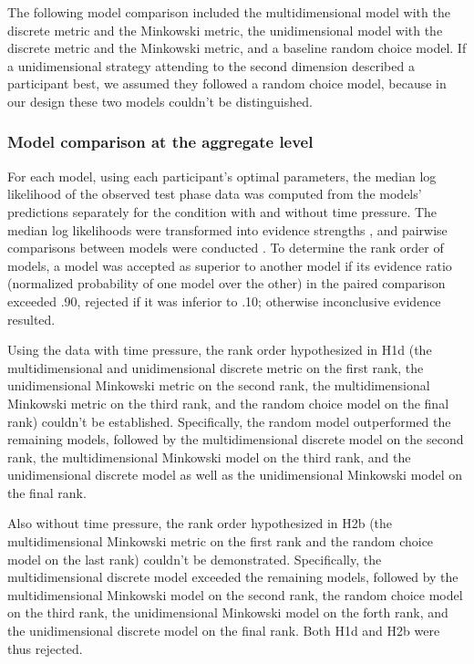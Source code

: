 \documentclass[a4paper,man,natbib]{apa6}
\begin{document}
The following model comparison included the multidimensional model with the discrete metric and the Minkowski metric, the unidimensional model with the discrete metric and the Minkowski metric, and a baseline random choice model. If a unidimensional strategy attending to the second dimension described a participant best, we assumed they followed a random choice model, because in our design these two models couldn't be distinguished. 

\subsubsection{Model comparison at the aggregate level} \label{sec:res_agg}
For each model, using each participant's optimal parameters, the median log likelihood of the observed test phase data was computed from the models' predictions separately for the condition with and without time pressure. The median log likelihoods were transformed into evidence strengths \citep[Akake weights,][]{wagenmakers2004aic}, and pairwise comparisons between models were conducted \citep[as in][p. 194]{wagenmakers2004aic}. To determine the rank order of models, a model was accepted as superior to another model if its evidence ratio (normalized probability of one model over the other) in the paired comparison exceeded .90, rejected if it was inferior to .10; otherwise inconclusive evidence resulted. 

Using the data with time pressure, the rank order hypothesized in H1d (the multidimensional and unidimensional discrete metric on the first rank, the unidimensional Minkowski metric on the second rank, the multidimensional Minkowski metric on the third rank, and the random choice model on the final rank) couldn't be established. Specifically, the random model outperformed the remaining models, followed by the multidimensional discrete model on the second rank, the multidimensional Minkowski model on the third rank, and the unidimensional discrete model as well as the unidimensional Minkowski model on the final rank. 

Also without time pressure, the rank order hypothesized in H2b (the multidimensional Minkowski metric on the first rank and the random choice model on the last rank) couldn't be demonstrated. Specifically, the multidimensional discrete model exceeded the remaining models, followed by the multidimensional Minkowski model on the second rank, the random choice model on the third rank, the unidimensional Minkowski model on the forth rank, and the unidimensional discrete model on the final rank. Both H1d and H2b were thus rejected.
\end{document}
